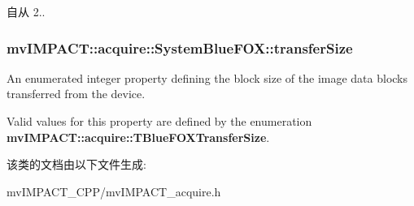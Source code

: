 \begin{DoxySince}{自从}
2.. 
\end{DoxySince}
\hypertarget{classmv_i_m_p_a_c_t_1_1acquire_1_1_system_blue_f_o_x_acf916c9ee98d686ac1e9a00afc4a459c}{
\subsubsection[{transfer\+Size}]{ mv\+I\+M\+P\+A\+C\+T\+::acquire\+::\+System\+Blue\+F\+O\+X\+::transfer\+Size}}\label{classmv_i_m_p_a_c_t_1_1acquire_1_1_system_blue_f_o_x_acf916c9ee98d686ac1e9a00afc4a459c}


An enumerated integer property defining the block size of the image data blocks transferred from the device. 

Valid values for this property are defined by the enumeration {\bfseries mv\+I\+M\+P\+A\+C\+T\+::acquire\+::\+T\+Blue\+F\+O\+X\+Transfer\+Size}. 

该类的文档由以下文件生成\+:\begin{DoxyCompactItemize}
\item 
mv\+I\+M\+P\+A\+C\+T\+\_\+\+C\+P\+P/mv\+I\+M\+P\+A\+C\+T\+\_\+acquire.\+h\end{DoxyCompactItemize}
